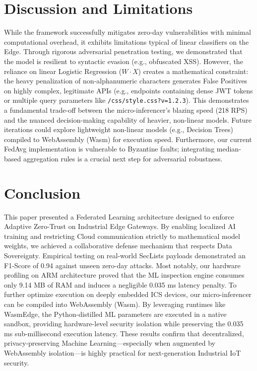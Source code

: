\documentclass[conference]{IEEEtran}
\begin{document}
\section{Discussion and Limitations}
While the framework successfully mitigates zero-day vulnerabilities with minimal computational overhead, it exhibits limitations typical of linear classifiers on the Edge. Through rigorous adversarial penetration testing, we demonstrated that the model is resilient to syntactic evasion (e.g., obfuscated XSS). However, the reliance on linear Logistic Regression ($W \cdot X$) creates a mathematical constraint: the heavy penalization of non-alphanumeric characters generates False Positives on highly complex, legitimate APIs (e.g., endpoints containing dense JWT tokens or multiple query parameters like \texttt{/css/style.css?v=1.2.3}). This demonstrates a fundamental trade-off between the micro-inferencer's blazing speed (218 RPS) and the nuanced decision-making capability of heavier, non-linear models. Future iterations could explore lightweight non-linear models (e.g., Decision Trees) compiled to WebAssembly (Wasm) for execution speed. Furthermore, our current FedAvg implementation is vulnerable to Byzantine faults; integrating median-based aggregation rules is a crucial next step for adversarial robustness.

\section{Conclusion}
This paper presented a Federated Learning architecture designed to enforce Adaptive Zero-Trust on Industrial Edge Gateways. By enabling localized AI training and restricting Cloud communication strictly to mathematical model weights, we achieved a collaborative defense mechanism that respects Data Sovereignty. Empirical testing on real-world SecLists payloads demonstrated an F1-Score of 0.94 against unseen zero-day attacks. Most notably, our hardware profiling on ARM architecture proved that the ML inspection engine consumes only 9.14 MB of RAM and induces a negligible 0.035 ms latency penalty. To further optimize execution on deeply embedded ICS devices, our micro-inferencer can be compiled into WebAssembly (Wasm). By leveraging runtimes like WasmEdge, the Python-distilled ML parameters are executed in a native sandbox, providing hardware-level security isolation while preserving the 0.035 ms sub-millisecond execution latency. These results confirm that decentralized, privacy-preserving Machine Learning—especially when augmented by WebAssembly isolation—is highly practical for next-generation Industrial IoT security.
\end{document}

